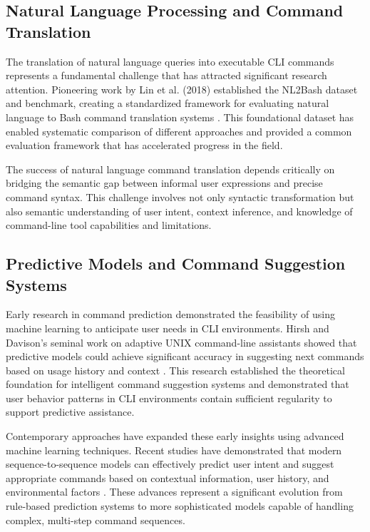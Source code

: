 \subsection{Natural Language Processing and Command Translation}

The translation of natural language queries into executable CLI commands represents a fundamental challenge that has attracted significant research attention. Pioneering work by Lin et al. (2018) established the NL2Bash dataset and benchmark, creating a standardized framework for evaluating natural language to Bash command translation systems \cite{lin2018}. This foundational dataset has enabled systematic comparison of different approaches and provided a common evaluation framework that has accelerated progress in the field.

The success of natural language command translation depends critically on bridging the semantic gap between informal user expressions and precise command syntax. This challenge involves not only syntactic transformation but also semantic understanding of user intent, context inference, and knowledge of command-line tool capabilities and limitations.

\subsection{Predictive Models and Command Suggestion Systems}

Early research in command prediction demonstrated the feasibility of using machine learning to anticipate user needs in CLI environments. Hirsh and Davison's seminal work on adaptive UNIX command-line assistants showed that predictive models could achieve significant accuracy in suggesting next commands based on usage history and context \cite{hirsh1997}. This research established the theoretical foundation for intelligent command suggestion systems and demonstrated that user behavior patterns in CLI environments contain sufficient regularity to support predictive assistance.

Contemporary approaches have expanded these early insights using advanced machine learning techniques. Recent studies have demonstrated that modern sequence-to-sequence models can effectively predict user intent and suggest appropriate commands based on contextual information, user history, and environmental factors \cite{singh2020}. These advances represent a significant evolution from rule-based prediction systems to more sophisticated models capable of handling complex, multi-step command sequences.

